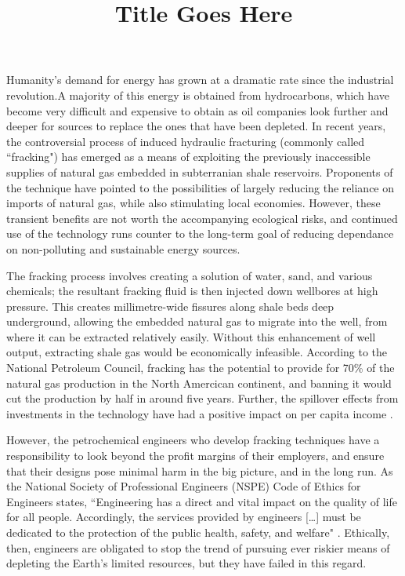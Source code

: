 \documentclass[12pt,letterpaper]{article}
\title{Title Goes Here}
\begin{document}
\makeheader

Humanity's demand for energy has grown at a dramatic rate since the industrial revolution.A majority of this energy is obtained from hydrocarbons, which have become very difficult and expensive to obtain as oil companies look further and deeper for sources to replace the ones that have been depleted. In recent years, the controversial process of induced hydraulic fracturing (commonly called ``fracking") has emerged as a means of exploiting the previously inaccessible supplies of natural gas embedded in subterranian shale reservoirs. Proponents of the technique have pointed to the possibilities of largely reducing the reliance on imports of natural gas, while also stimulating local economies. However, these transient benefits are not worth the accompanying ecological risks, and continued use of the technology runs counter to the long-term goal of reducing dependance on non-polluting and sustainable energy sources.

The fracking process involves creating a solution of water, sand, and various chemicals; the resultant fracking fluid is then injected down wellbores at high pressure. This creates millimetre-wide fissures along shale beds deep underground, allowing the embedded natural gas to migrate into the well, from where it can be extracted relatively easily. Without this enhancement of well output, extracting shale gas would be economically infeasible. According to the National Petroleum Council, fracking has the potential to provide for 70\%  \cite{npc}  of the natural gas production in the North Amercican continent, and banning it would cut the production by half in around five years. Further, the spillover effects from investments in the technology have had a positive impact on per capita income \cite{mining}.

However, the petrochemical engineers who develop fracking techniques have a responsibility to look beyond the profit margins of their employers, and ensure that their designs pose minimal harm in the big picture, and in the long run.
As the National Society of Professional Engineers (NSPE) Code of Ethics for Engineers states, 
``Engineering has a direct and vital impact on the quality of life for all people. Accordingly, the services provided by engineers [\ldots] must be dedicated to the protection of the public health, safety, and welfare" \cite{ethics}.
Ethically, then, engineers are obligated to stop the trend of pursuing ever riskier means of depleting the Earth's limited resources, but they have failed in this regard.
\end{document}
